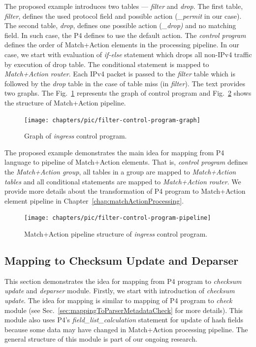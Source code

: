 The proposed example introduces two tables --- \textit{filter} and \textit{drop}. The first table, \textit{filter}, defines the used protocol field 
and possible action (\textit{\_permit} in our case). The second table, \textit{drop}, defines one possible action 
(\textit{\_drop)} and no matching field. In such case, the P4 defines to use the default action. 
The \textit{control program} defines the order of Match+Action elements in the processing pipeline. 
In our case, we start with evaluation of \textit{if-else} statement which drops all non-IPv4 traffic by execution of drop table. 
The conditional statement is mapped to \emph{Match+Action router}. Each IPv4 packet is passed to the
\textit{filter} table which is followed by the \textit{drop} table in the case of table miss (in \textit{filter}).
The text provides two graphs. The Fig.~\ref{fig:grapIpv4Program} represents the graph of control program and 
Fig.~\ref{fig:matchActionIpv4Program} shows the structure of Match+Action pipeline.

\begin{figure}[h]
    \centering
    \texttt{[image: chapters/pic/filter-control-program-graph]}
    \caption{Graph of \textit{ingress} control program.}
    \label{fig:grapIpv4Program}
\end{figure}

The proposed example demonstrates the main idea for mapping from P4 language to pipeline of Match+Action elements. 
That is, \textit{control program} defines the \emph{Match+Action group}, all tables in a group are mapped to \emph{Match+Action tables} and all 
conditional statements are mapped to \emph{Match+Action router}.
We provide more details about the transformation of P4 program to Match+Action element pipeline in Chapter~\ref{chap:matchActionProcessing}.

\begin{figure}[h]
    \centering
    \texttt{[image: chapters/pic/filter-control-program-pipeline]}
    \caption{Match+Action pipeline structure of \textit{ingress} control program.}
    \label{fig:matchActionIpv4Program}
\end{figure}

\subsection{Mapping to Checksum Update and Deparser}
This section demonstrates the idea for mapping from P4 program to \emph{checksum update} and \emph{deparser} module. 
Firstly, we start with  introduction of \emph{checksum update}. The idea for mapping is similar to mapping of P4 program to \emph{check} module
(see Sec.~\ref{sec:mappingToParserMetadataCheck} for more details). 
This module also uses P4's \textit{field\_list\_calculation} statement for update of hash fields because some data may have changed 
in Match+Action processing pipeline. The general structure of this module is part of our ongoing research. 

